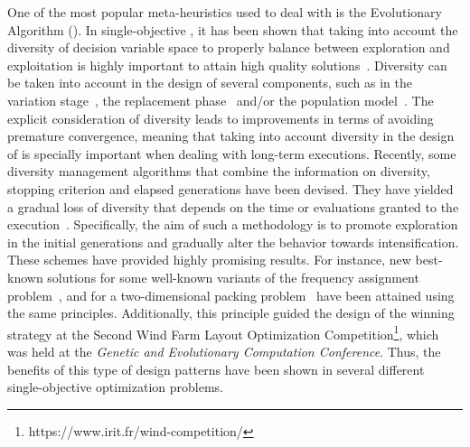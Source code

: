 One of the most popular meta-heuristics used to deal with \MOPS{} is the Evolutionary Algorithm (\EA{}).
%
In single-objective \EAS{}, it has been shown that taking into account the diversity of decision variable space
to properly balance between exploration and exploitation is highly important to attain high quality 
solutions~\citep{Joel:BALANCE_DIVERSITY}.
%
Diversity can be taken into account in the design of several components, such as in the variation 
stage~\citep{Joel:FUZZY_ADAPTIVE_GA,Joel:CROSSOVER_DIVERSITY}, the replacement phase~\citep{Joel:MULTI_DYNAMIC} 
and/or the population model~\citep{Joel:SAWTOOTH}.
%
The explicit consideration of diversity leads to improvements in terms of avoiding premature convergence, 
meaning that taking into account diversity in the design of \EAS{} is specially important when dealing 
with long-term executions.
%
Recently, some diversity management algorithms that combine the information on diversity, stopping criterion and elapsed 
generations have been devised.
%
They have yielded a gradual loss of diversity that depends on the time or evaluations granted to the 
execution~\citep{Joel:MULTI_DYNAMIC}.
%
Specifically, the aim of such a methodology is to promote exploration in the initial generations and gradually alter the 
behavior towards intensification.
%
These schemes have provided highly promising results.
%
For instance, new best-known solutions for some well-known variants of the frequency assignment problem~\citep{Segura:17},
and for a two-dimensional packing problem~\citep{Joel:MULTI_DYNAMIC} have been attained using the same principles.
%
Additionally, this principle guided the design of the winning strategy at the Second Wind Farm Layout Optimization 
Competition\footnote{https://www.irit.fr/wind-competition/}, which was held at the {\em Genetic and Evolutionary 
Computation Conference}.
%
Thus, the benefits of this type of design patterns have been shown in several different single-objective optimization problems.

